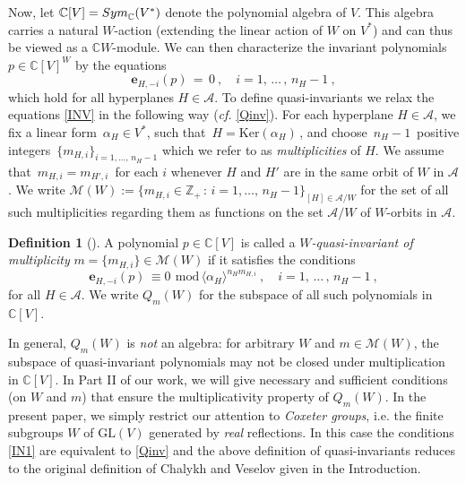 \documentclass[11pt]{amsart}
\theoremstyle{definition}
\newtheorem{defi}[theorem]{Definition}
\theoremstyle{remark}
\numberwithin{equation}{section}
\newcommand{\la}{\label}
\newcommand{\GL}{\mathrm{GL}}
\newcommand{\Ker}{\mathrm{Ker}}
\def\C{\mathbb C}
\def\c{\mathbb{C}}
\def\e{\boldsymbol{e}}
\def\A{\mathcal{A}}
\def\M{\mathcal{M}}
\def\Z{\mathbb{Z}}
\begin{document}
Now, let $\C[V] = {\rm Sym}_{\C}(V^*)$ denote the polynomial algebra of $V$. This algebra carries a natural $W$-action (extending the linear action of $W$ on $V^*$) and
can thus be viewed as a $\C W$-module. We can then characterize the invariant polynomials $ p \in \C[V]^W $  by the equations 
%
\begin{equation}
\la{INV} 
\e_{H, -i}(p)\,=\,0\ , \quad
i = 1,\,\ldots\,,\,n_H -1\ ,
\end{equation}
%
which hold for all hyperplanes $ H\in \A$. To define quasi-invariants we relax the equations \eqref{INV} in the following way ({\it cf.} \eqref{Qinv}). 
For each hyperplane $ H \in \A $, we fix a linear form $\,\alpha_H \in V^* $, such that $\,H = \Ker(\alpha_H) \,$, and choose $\, n_H - 1 \,$ positive integers
$\, \{m_{H,i}\}_{i = 1, \ldots,\, n_H - 1} $ which we refer to as {\it multiplicities} of $H$. We assume that $\, m_{H,i} = m_{H',i}\,$ for each $i$ whenever $ H $ and $ H' $ are in the same orbit of $ W $ in $\A$. 
We write $ \M(W) := \{m_{H,i} \in \Z_{+}\,:\,  i = 1, \ldots,\, n_H - 1\}_{[H] \in \A/W} $ for the set of all such multiplicities regarding them as functions on the set $\A/W$ of $W$-orbits in $\A$.
\begin{defi}[\cite{BC11}] 
\la{comq}
A polynomial $ p \in \c[V]$ is called a {\it $W$-quasi-invariant 
of multiplicity} $ m = \{m_{H, i}\} \in \M(W) $ if it satisfies the conditions
%
\begin{equation}
\label{IN1} 
\e_{H, -i} (p)\, \equiv 0\ \, \mbox{mod}\,\langle\alpha_H
\rangle^{n_H m_{H,i}}  \ , \quad
i = 1,\,\ldots\,,\,n_H -1\ ,
\end{equation}
%
for all  $ H \in \A $. We write $ Q_m(W) $ for the subspace of all such polynomials in $\C[V]$.
\end{defi}
%
In general, $Q_m(W)$ is {\it not} an algebra: for arbitrary $W$ and $m \in \M(W)$, the subspace of quasi-invariant polynomials may not be closed under multiplication in $ \C[V]$. In Part II of our work, we will give necessary and sufficient conditions (on $W$ and $m$) that ensure the multiplicativity property of $Q_m(W)$.
In the present paper, we simply restrict our attention to {\it Coxeter groups}, i.e. the finite subgroups $W$ of $\GL(V)$ generated by {\it real} reflections. In this case the conditions \eqref{IN1} are equivalent to \eqref{Qinv} and the above definition of quasi-invariants reduces to the original definition of Chalykh and Veselov \cite{CV90} given in the Introduction. 

\vspace{1ex}
\end{document}

